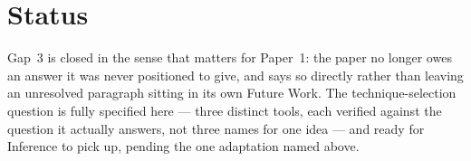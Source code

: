 \documentclass[11pt]{article}
\begin{document}
\section{Status}

Gap~3 is closed in the sense that matters for Paper~1: the paper no
longer owes an answer it was never positioned to give, and says so
directly rather than leaving an unresolved paragraph sitting in its
own Future Work. The technique-selection question is fully specified
here --- three distinct tools, each verified against the question it
actually answers, not three names for one idea --- and ready for
Inference to pick up, pending the one adaptation named above.
\end{document}
